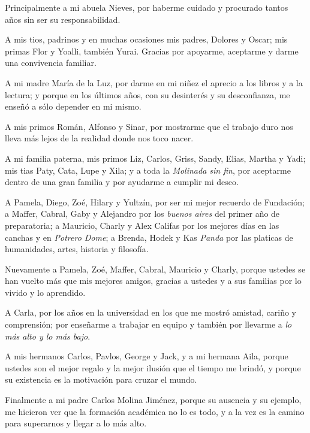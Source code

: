 \begin{acknowledgementspersonal}
	
Principalmente a mi abuela Nieves, por haberme cuidado y procurado tantos años sin ser su responsabilidad. 

\vspace{0.5cm}
A mis tios, padrinos y en muchas ocasiones mis padres, Dolores y Oscar; mis primas Flor y Yoalli, también Yurai. Gracias por apoyarme, aceptarme y darme una convivencia familiar.

\vspace{0.5cm}
A mi madre María de la Luz, por darme en mi niñez el aprecio a los libros y a la lectura; y porque en los últimos años, con su desinterés y su desconfianza, me enseñó a sólo depender en mi mismo. 

\vspace{0.5cm}
A mis primos Román, Alfonso y Sinar, por mostrarme que el trabajo duro nos lleva más lejos de la realidad donde nos toco nacer. 

\vspace{0.5cm}
A mi familia paterna, mis primos Liz, Carlos, Griss, Sandy, Elias, Martha y Yadi; mis tias Paty, Cata, Lupe y Xila; y a toda la \textit{Molinada sin fin}, por aceptarme dentro de una gran familia y por ayudarme a cumplir mi deseo.  

\vspace{0.5cm}
A Pamela, Diego, Zoé, Hilary y Yultzín, por ser mi mejor recuerdo de Fundación;  a Maffer, Cabral, Gaby y Alejandro por los \textit{buenos aires} del primer año de preparatoria; a Mauricio, Charly y Alex Califas por los mejores días en las canchas y en \textit{Potrero Dome}; a Brenda, Hodek y Kas \textit{Panda} por las platicas de humanidades, artes, historia y filosofía.  

\vspace{0.5cm}
Nuevamente a Pamela, Zoé, Maffer, Cabral, Mauricio y Charly, porque ustedes se han vuelto más que mis mejores amigos, gracias a ustedes y a sus familias por lo vivido y lo aprendido.

\vspace{0.5cm}
A Carla, por los años en la universidad en los que me mostró amistad, cariño y comprensión; por enseñarme a trabajar en equipo y también por llevarme a \textit{lo más alto y lo más bajo}.

\vspace{0.5cm}
A mis hermanos Carlos, Pavlos, George y Jack,  y a mi hermana Aila, porque ustedes son el mejor regalo y la mejor ilusión que el tiempo me brindó, y porque su existencia es la motivación para cruzar el mundo.

\vspace{0.5cm}
Finalmente a mi padre Carlos Molina Jiménez, porque su ausencia y su ejemplo, me hicieron ver que la formación académica no lo es todo,  y a la vez es la camino para superarnos y llegar a lo más alto. 


\end{acknowledgementspersonal}